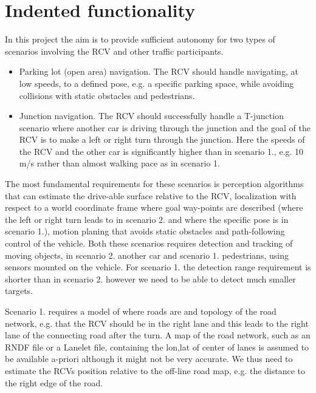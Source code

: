 \documentclass[11pt,a4paper]{article}
\begin{document}
\section{Indented functionality}

In this project the aim is to provide sufficient autonomy for two
types of scenarios involving the RCV and other traffic participants.

\begin{itemize}
\item 
Parking lot (open area) navigation. The RCV should handle
navigating, at low speeds, to a defined pose, e.g. a
specific parking space, while avoiding collisions with static obstacles
and pedestrians.

\item 
Junction navigation. The RCV should successfully handle a T-junction
scenario where another car is driving through the junction and the
goal of the RCV is to make a left or right turn through the
junction. Here the speeds of the RCV and the other car is
significantly higher than in scenario 1., e.g. 10 m/s rather than
almost walking pace as in scenario 1.

\end{itemize}

The most fundamental requirements for these scenarios is perception
algorithms that can estimate the drive-able surface relative to the RCV,
localization with respect to a world coordinate frame where goal
way-points are described (where the left or right turn leads to in
scenario 2. and where the specific pose is in scenario 1.), motion
planing that avoids static obstacles and path-following control of the
vehicle. Both these scenarios requires detection and tracking of moving
objects, in scenario 2. another car and scenario 1. pedestrians, using
sensors mounted on the vehicle. For scenario 1. the detection range
requirement is shorter than in scenario 2.  however we need to be able
to detect much smaller targets.

Scenario 1. requires a model of where roads are and topology of the
road network, e.g. that the RCV should be in the right lane and this
leads to the right lane of the connecting road after the turn. A map
of the road network, such as an RNDF file or a Lanelet file, containing
the lon,lat of center of lanes is assumed to be available a-priori
although it might not be very accurate. We thus need to estimate the
RCVs position relative to the off-line road map, e.g. the distance to
the right edge of the road.
\end{document}
